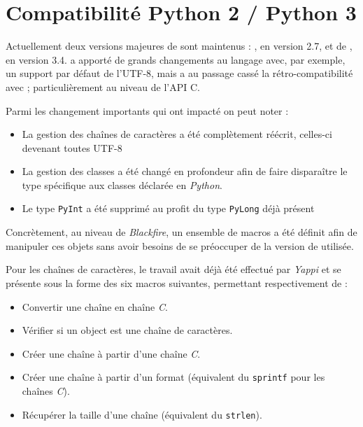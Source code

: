 \chapter{Compatibilité Python 2 / Python 3}
  \label{app:compat-py3}
  \label{app:compat-23}
Actuellement deux versions majeures de \Python sont maintenus : , en version 2.7, et de , en version 3.4.  a apporté de grands changements au langage avec, par exemple, un support par défaut de l'UTF-8, mais a au passage cassé la rétro-compatibilité avec  ; particulièrement au niveau de l'API C.

Parmi les changement importants qui ont impacté \Blackfire on peut noter :
\begin{itemize}
\item La gestion des chaînes de caractères a été complètement réécrit, celles-ci devenant toutes UTF-8
\item La gestion des classes a été changé en profondeur afin de faire disparaître le type spécifique aux classes déclarée en \emph{Python}.
\item Le type \verb|PyInt| a été supprimé au profit du type \verb|PyLong| déjà présent
\end{itemize}

Concrètement, au niveau de \emph{Blackfire}, un ensemble de macros a été définit afin de manipuler ces objets sans avoir besoins de se préoccuper de la version de \Python utilisée.

Pour les chaînes de caractères, le travail avait déjà été effectué par \emph{Yappi} et se présente sous la forme des six macros suivantes, permettant respectivement de :
\begin{itemize}
\item Convertir une chaîne \Python en chaîne \emph{C}.
\item Vérifier si un object \Python est une chaîne de caractères.
\item Créer une chaîne \Python à partir d'une chaîne \emph{C}.
\item Créer une chaîne \Python à partir d'un format (équivalent du \verb|sprintf| pour les chaînes \emph{C}).
\item Récupérer la taille d'une chaîne \Python (équivalent du \verb|strlen|).
\end{itemize}

